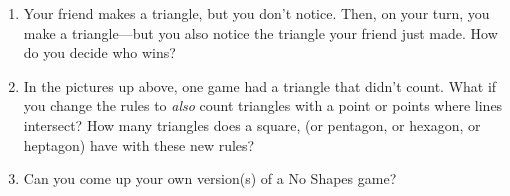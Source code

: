 \documentclass{article}
\begin{document}
\begin{enumerate}
        \item Your friend makes a triangle, but you don't notice. Then, on your turn, you make a triangle---but you also notice the triangle your friend just made. How do you decide who wins?
        \item In the pictures up above, one game had a triangle that didn't count. What if you change the rules to \textit{also} count triangles with a point or points where lines intersect? How many triangles does a square, (or pentagon, or hexagon, or heptagon) have with these new rules?
        \item Can you come up your own version(s) of a No Shapes game?
    \end{enumerate}

    \clearpage
    \begin{multicols}{2}
        \begin{center}
            
            \vfill
            \hrulefill
            \vfill
            
            \vfill
            \hrulefill
            \vfill
            
        \columnbreak
            
            \vfill
            \hrulefill
            \vfill
            
            \vfill
            \hrulefill
            \vfill
            
        \clearpage
            
            \vfill
            \hrulefill
            \vfill
            
            \vfill
            \hrulefill
            \vfill
            
        \columnbreak
            
            \vfill
            \hrulefill
            \vfill
            
            \vfill
            \hrulefill
            \vfill
            
        \clearpage
            
            \vfill
            \hrulefill
            \vfill
            
            \vfill
            \hrulefill
            \vfill
            
        \columnbreak
            
            \vfill
            \hrulefill
            \vfill
            
            \vfill
            \hrulefill
            \vfill
            
        \clearpage
            
            \vfill
            \hrulefill
            \vfill
            
            \vfill
            \hrulefill
            \vfill
            
        \columnbreak
            
            \vfill
            \hrulefill
            \vfill
            
            \vfill
            \hrulefill
            \vfill
            
        \clearpage
        \end{center}
    \end{multicols}
\end{document}

